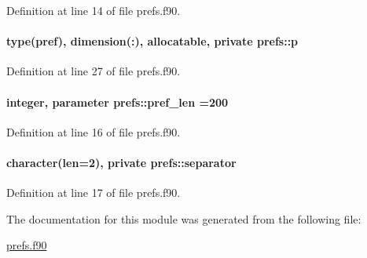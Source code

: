 Definition at line 14 of file prefs.\-f90.

\hypertarget{classprefs_a531c04d9846e2077ada85bba64d0f54e}{
\paragraph[{p}]{\setlength{\rightskip}{0pt plus 5cm}type({\bf pref}), dimension(\-:), allocatable, private prefs\-::p\hspace{0.3cm}{\ttfamily [private]}}}\label{classprefs_a531c04d9846e2077ada85bba64d0f54e}


Definition at line 27 of file prefs.\-f90.

\hypertarget{classprefs_a7290161561ea5360d0049f36d9d3a31a}{
\paragraph[{pref\-\_\-len}]{\setlength{\rightskip}{0pt plus 5cm}integer, parameter prefs\-::pref\-\_\-len =200}}\label{classprefs_a7290161561ea5360d0049f36d9d3a31a}


Definition at line 16 of file prefs.\-f90.

\hypertarget{classprefs_aec9daa91ee7459076a1ab3ee3cd03fcf}{
\paragraph[{separator}]{\setlength{\rightskip}{0pt plus 5cm}character(len=2), private prefs\-::separator\hspace{0.3cm}{\ttfamily [private]}}}\label{classprefs_aec9daa91ee7459076a1ab3ee3cd03fcf}


Definition at line 17 of file prefs.\-f90.



The documentation for this module was generated from the following file\-:\begin{DoxyCompactItemize}
\item 
\hyperlink{prefs_8f90}{prefs.\-f90}\end{DoxyCompactItemize}
